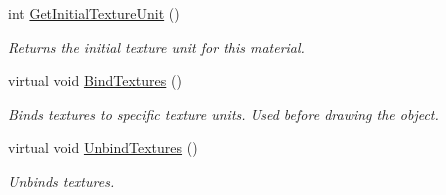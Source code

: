 \begin{DoxyCompactItemize}
int \mbox{\hyperlink{class_geometry_engine_1_1_geometry_material_1_1_alpha_texture_material_af2339e0ddb95a9b39cfce856d218819c}{Get\+Initial\+Texture\+Unit}} ()
\begin{DoxyCompactList}\small\item\em Returns the initial texture unit for this material. \end{DoxyCompactList}\item 
\mbox{\label{class_geometry_engine_1_1_geometry_material_1_1_alpha_texture_material_af3630e8d48d69bbb9e6601f4ae67924d}} 
virtual void \mbox{\hyperlink{class_geometry_engine_1_1_geometry_material_1_1_alpha_texture_material_af3630e8d48d69bbb9e6601f4ae67924d}{Bind\+Textures}} ()
\begin{DoxyCompactList}\small\item\em Binds textures to specific texture units. Used before drawing the object. \end{DoxyCompactList}\item 
\mbox{\label{class_geometry_engine_1_1_geometry_material_1_1_alpha_texture_material_a54e0e7af565c38f771ae195f3e2a5a39}} 
virtual void \mbox{\hyperlink{class_geometry_engine_1_1_geometry_material_1_1_alpha_texture_material_a54e0e7af565c38f771ae195f3e2a5a39}{Unbind\+Textures}} ()
\begin{DoxyCompactList}\small\item\em Unbinds textures. \end{DoxyCompactList}\end{DoxyCompactItemize}
